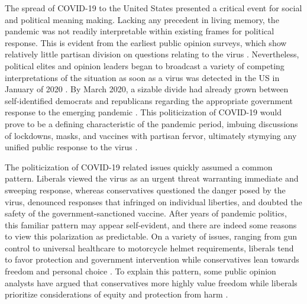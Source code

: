 \documentclass{article} %
\begin{document}
The spread of COVID-19 to the United States presented a critical event
for social and political meaning making. Lacking any precedent in living
memory, the pandemic was not readily interpretable within existing
frames for political response. This is evident from the earliest public
opinion surveys, which show relatively little partisan division on
questions relating to the virus
\parencite{Deane_undated-zp}. Nevertheless, political elites and opinion leaders began to
broadcast a variety of competing interpretations of the situation as
soon as a virus was detected in the US in January of 2020
\parencite{Stokes2020-vw}. By
March 2020, a sizable divide had already grown between self-identified
democrats and republicans regarding the appropriate government response
to the emerging pandemic
\parencite{Gadarian2021-su}. This
politicization of COVID-19 would prove to be a defining characteristic
of the pandemic period, imbuing discussions of lockdowns, masks, and
vaccines with partisan fervor, ultimately stymying any unified public
response to the virus
\parencite{Albrecht2022-kj, Allcott2020-iy, Chen2022-eb}.

The politicization of COVID-19 related issues quickly assumed a common
pattern. Liberals viewed the virus as an urgent threat warranting
immediate and sweeping response, whereas conservatives questioned the
danger posed by the virus, denounced responses that infringed on
individual liberties, and doubted the safety of the
government-sanctioned vaccine. After years of pandemic politics, this
familiar pattern may appear self-evident, and there are indeed some
reasons to view this polarization as predictable. On a variety of
issues, ranging from gun control to universal healthcare to motorcycle
helmet requirements, liberals tend to favor protection and government
intervention while conservatives lean towards freedom and personal
choice \parencite{Homer2009-gw}. To explain this pattern, some public opinion analysts have
argued that conservatives more highly value freedom while liberals
prioritize considerations of equity and protection from harm \parencite{Feldman1992-lf, Haidt2012-fy}.
\end{document}

